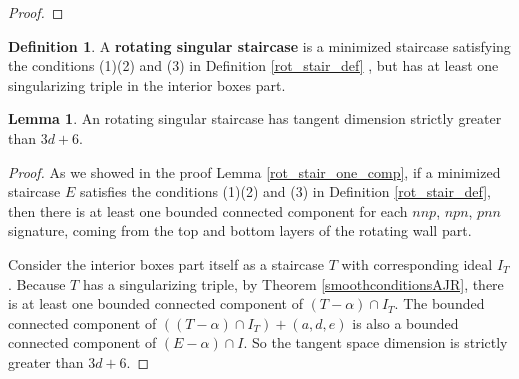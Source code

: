 \documentclass{amsart}[10pt]
\theoremstyle{plain}
\theoremstyle{definition}
\newtheorem{lemma}[theorem]{Lemma}
\newtheorem{definition}[theorem]{Definition}
\begin{document}
\begin{proof}


\end{proof}


\begin{definition}
\label{rot_stair_definition_comb}
A \textbf{rotating singular staircase} is a minimized staircase satisfying the conditions (1)(2) and (3) in Definition \ref{rot_stair_def} , but has at least one singularizing triple in the interior boxes part.
\end{definition}

\begin{lemma}
\label{rot_sing_stair}
An rotating singular staircase has tangent dimension strictly greater than $3d+6$.
\end{lemma}

\begin{proof}
As we showed in the proof Lemma \ref{rot_stair_one_comp}, if a minimized staircase $E$ satisfies the conditions (1)(2) and (3) in Definition \ref{rot_stair_def}, then there is at least one bounded connected component for each $nnp$, $npn$, $pnn$ signature, coming from the top and bottom layers of the rotating wall part. 

Consider the interior boxes part itself as a staircase $T$ with corresponding ideal $I_T$. Because $T$ has a singularizing triple, by Theorem \ref{smoothconditionsAJR}, there is at least one bounded connected component of $(T-\alpha) \cap I_T$. The bounded connected component of $((T-\alpha) \cap I_T) +(a,d,e)$ is also a bounded connected component of $(E-\alpha) \cap I$. So the tangent space dimension is strictly greater than $3d+6$.
\end{proof}
\end{document}

